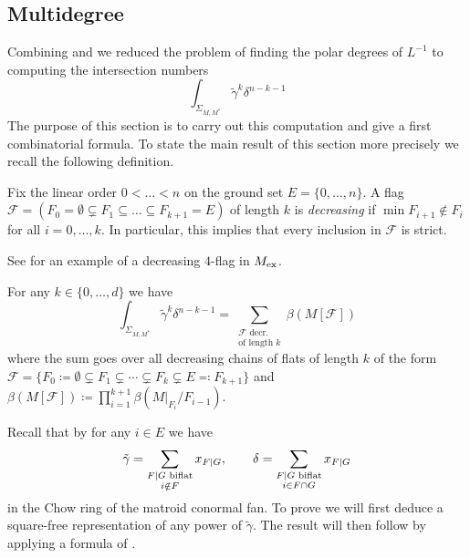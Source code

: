 \documentclass[12pt,a4paper,english]{scrartcl}
\begin{document}
\subsection{Multidegree} \label{sec:cycling}

Combining  and  we reduced the problem of finding the polar degrees of $L^{-1}$ to computing the intersection numbers \[
\int_{\Sigma_{M,M^*}}\widetilde{\gamma}^k\delta^{n-k-1}
\]
The purpose of this section is to carry out this computation and give a first combinatorial formula. To state the main result of this section more precisely we recall the following definition. 
\begin{definition}\label{def:decreasing flag}
Fix the linear order $ 0 < \dots <n$ on the ground set $E=\{0,\ldots,n\}$. A flag $\mathcal{F} = (F_{0} = \emptyset \subsetneq F_1 \subseteq \dots \subseteq F_{k+1} = E)$ of length $k$ is \emph{decreasing} if $\min F_{i+1} \notin F_{i}$ for all $i=0,\dots,k$. In particular, this implies that every inclusion in $\mathcal{F}$ is strict.
\end{definition}
See  for an example of a decreasing $4$-flag in $M_{\textup{ex}}$.

\begin{proposition}
    \label{intersectionNumberToFlagBeta}
    For any $k\in \{0,\ldots, d\}$ we have
    \[
\int_{\Sigma_{M,M^*}} \widetilde{\gamma}^k \delta^{n-k-1} = \sum_{\substack{\mathcal{F}\text{ decr.}\\ \text{of length } k}} \beta(M[\mathcal{F}])
\]
where the sum goes over all decreasing chains of flats of length $k$ of the form $\mathcal{F}=\{F_0\coloneq \emptyset \subsetneq F_1\subsetneq \cdots \subsetneq F_{k}\subsetneq E\eqqcolon F_{k+1}\}$ and $\beta(M[\mathcal{F}])\coloneq\prod_{i=1}^{k+1}\beta(M|_{F_{i}}/F_{i-1})$.
\end{proposition}

Recall that by  for any $i \in E$ we have
\[
\tilde{\gamma} = \sum_{\substack{F|G \textup{ biflat}\\ i \notin F}} x_{F|G}, \qquad \delta = \sum_{\substack{F|G \textup{ biflat}\\ i \in F \cap G}} x_{F|G}
\]
in the Chow ring of the matroid conormal fan.
To prove  we will first deduce a square-free representation of any power of $\widetilde{\gamma}$. The result will then follow by applying a formula of \cite{Ardila2022}.
\end{document}
